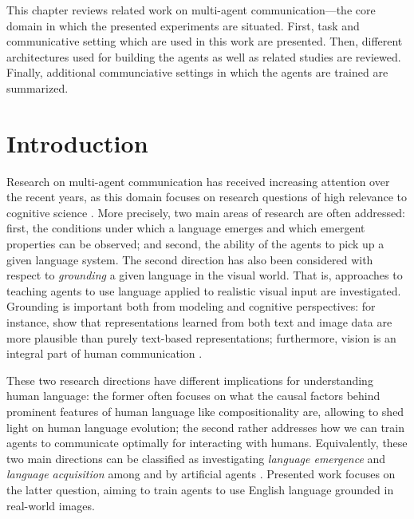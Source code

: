 
This chapter reviews related work on multi-agent communication---the core domain in which the presented experiments are situated. First, task and communicative setting which are used in this work are presented. Then, different architectures used for building the agents as well as related studies are reviewed. Finally, additional communciative settings in which the agents are trained are summarized. 


\section{Introduction}
Research on multi-agent communication has received increasing attention over the recent years, as this domain focuses on research questions of high relevance to cognitive science \parencite{lazaridou2020emergent}. More precisely, two main areas of research are often addressed: first, the conditions under which a language emerges and which emergent properties can be observed; and second, the ability of the agents to pick up a given language system. %
The second direction has also been considered with respect to \textit{grounding} a given language in the visual world. That is, approaches to teaching agents to use language applied to realistic visual input are investigated. Grounding is important both from modeling and cognitive perspectives: for instance, \cite{bruni2014multimodal} show that representations learned from both text and image data are more plausible than purely text-based representations; furthermore, vision is an integral part of human communication \parencite{tomasello2010origins, harnad1990symbol}. 

These two research directions have different implications for understanding human language: the former often focuses on what the causal factors behind prominent features of human language like compositionality are, allowing to shed light on human language evolution; the second rather addresses how we can train agents to communicate optimally for interacting with humans. Equivalently, these two main directions can be classified as investigating \textit{language emergence} and \textit{language acquisition} among and by artificial agents \parencite{lazaridou2018emergence, lazaridou2020emergent}.
Presented work focuses on the latter question, aiming to train agents to use English language grounded in real-world images.

